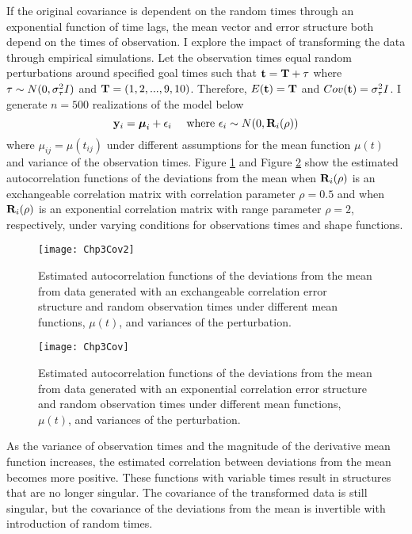 If the original covariance is dependent on the random times through an exponential function of time lags, the mean vector and error structure both depend on the times of observation. I explore the impact of transforming the data through empirical simulations. Let the observation times equal random perturbations around specified goal times such that $\mathbf t = \mathbf T + \mathbf \tau$ where $\mathbf \tau\sim N(0,\sigma^{2}_{\tau}I)$ and $\mathbf T = (1,2,...,9,10)$. Therefore, $E(\mathbf t) = \mathbf T$ and $Cov(\mathbf t ) = \sigma^{2}_{\tau}I$. I generate $n=500$ realizations of the model below
$$\mathbf y_{i} = \boldsymbol\mu_{i} + \epsilon_{i}\quad\text{ where }\epsilon_{i}\sim N(0,\mathbf R_{i}(\rho))$$
where $\mu_{ij}=\mu(t_{ij})$ under different assumptions for the mean function $\mu(t)$ and variance of the observation times. Figure \ref{fig:cov1} and Figure \ref{fig:cov} show the estimated autocorrelation functions of the deviations from the mean when $\mathbf R_{i}(\rho)$ is an exchangeable correlation matrix with correlation parameter $\rho=0.5$ and when  $\mathbf R_{i}(\rho)$ is an exponential correlation matrix with range parameter $\rho=2$, respectively, under varying conditions for observations times and shape functions.
\begin{figure}
\begin{center}
\texttt{[image: Chp3Cov2]}
\end{center}
\caption{Estimated autocorrelation functions of the deviations from the mean from data generated with an exchangeable correlation error structure and random observation times under different mean functions, $\mu(t)$, and variances of the perturbation.}
\label{fig:cov1}
\end{figure}

\begin{figure}
\begin{center}
\texttt{[image: Chp3Cov]}
\end{center}
\caption{Estimated autocorrelation functions of the deviations from the mean from data generated with an exponential correlation error structure and random observation times under different mean functions, $\mu(t)$, and variances of the perturbation.}
\label{fig:cov}
\end{figure}

As the variance of observation times and the magnitude of the derivative mean function increases, the estimated correlation between deviations from the mean becomes more positive. These functions with variable times result in structures that are no longer singular. The covariance of the transformed data is still singular, but the covariance of the deviations from the mean is invertible with introduction of random times.

